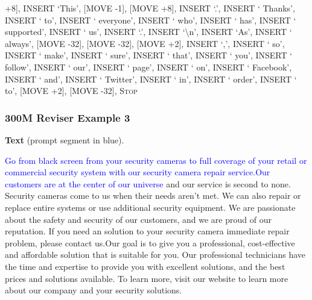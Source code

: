 \documentclass[11pt]{article}
\DeclareRobustCommand{\Stop}{\ifmmode\text{\textsc{Stop}}\else\textsc{Stop}\fi}
\begin{document}
{+8], INSERT `This', [MOVE -1], [MOVE +8], INSERT `.', INSERT ` Thanks', INSERT ` to', INSERT ` everyone', INSERT ` who', INSERT ` has', INSERT ` supported', INSERT ` us', INSERT `.', INSERT `\textbackslash{}n', INSERT `As', INSERT ` always', [MOVE -32], [MOVE -32], [MOVE +2], INSERT `,', INSERT ` so', INSERT ` make', INSERT ` sure', INSERT ` that', INSERT ` you', INSERT ` follow', INSERT ` our', INSERT ` page', INSERT ` on', INSERT ` Facebook', INSERT ` and', INSERT ` Twitter', INSERT ` in', INSERT ` order', INSERT ` to', [MOVE +2], [MOVE -32], \Stop\par
}
\vspace{0.8em}
\subsubsection*{300M Reviser Example 3}
\textbf{Text} (prompt segment in blue).\par
\ttfamily\small \textcolor{blue}{Go from black screen from your security cameras to full coverage of your retail or commercial security system with our security camera repair service.\newline Our customers are at the center of our universe} and our service is second to none. Security cameras come to us when their needs aren't met. We can also repair or replace entire systems or use additional security equipment. We are passionate about the safety and security of our customers, and we are proud of our reputation. If you need an solution to your security camera immediate repair problem, please contact us.\newline Our goal is to give you a professional, cost-effective and affordable solution that is suitable for you. Our professional technicians have the time and expertise to provide you with excellent solutions, and the best prices and solutions available. To learn more, visit our website to learn more about our company and your security solutions.
\end{document}
